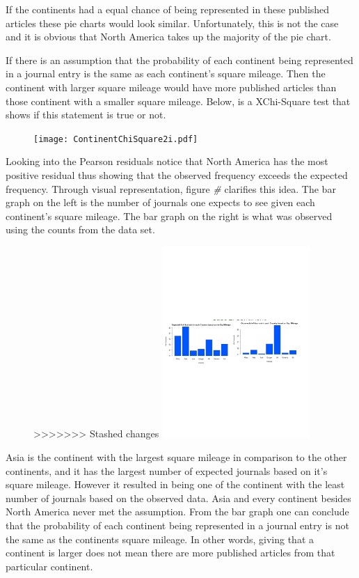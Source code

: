 \documentclass[
]{article}
\begin{document}
If the continents had a equal chance of being represented in these
published articles these pie charts would look similar. Unfortunately,
this is not the case and it is obvious that North America takes up the
majority of the pie chart.

If there is an assumption that the probability of each continent being
represented in a journal entry is the same as each continent's square
mileage. Then the continent with larger square mileage would have more
published articles than those continent with a smaller square mileage.
Below, is a XChi-Square test that shows if this statement is true or
not.

\begin{figure}
    \centering
    \texttt{[image: ContinentChiSquare2i.pdf]}
    \label{fig:Continent XChi-Square}
\end{figure}

Looking into the Pearson residuals notice that North America has the
most positive residual thus showing that the observed frequency exceeds
the expected frequency. Through visual representation, figure \emph{\#}
clarifies this idea. The bar graph on the left is the number of journals
one expects to see given each continent's square mileage. The bar graph
on the right is what was observed using the counts from the data set.

\begin{figure}
    \centering
>>>>>>> Stashed changes
    \includegraphics[width=0.50\textwidth]{Continent2BarGraph.pdf}
    \label{fig:Continent Bar Graph}
\end{figure}

Asia is the continent with the largest square mileage in comparison to
the other continents, and it has the largest number of expected journals
based on it's square mileage. However it resulted in being one of the
continent with the least number of journals based on the observed data.
Asia and every continent besides North America never met the assumption.
From the bar graph one can conclude that the probability of each
continent being represented in a journal entry is not the same as the
continents square mileage. In other words, giving that a continent is
larger does not mean there are more published articles from that
particular continent.
\end{document}
